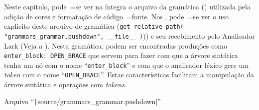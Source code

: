Neste capítulo,
pode~=se ver na íntegra o arquivo da gramática () utilizada pela adição de cores e
formatação de código~=fonte.
Nos ,
pode~=se ver o uso explicito deste arquivo de gramática (\texttt{get_relative_path( "grammars_grammar.pushdown",
__file__ )})) e
seu recebimento pelo Analisador Lark (Veja a ).
Nesta gramática,
podem ser encontradas produções como \texttt{enter_block:
OPEN_BRACE} que servem para fazer com que a árvore sintática tenha um nó com o nome ``\texttt{enter_block}'' e
com que o analisador léxico gere um \textit{token} com o nome ``\texttt{OPEN_BRACE}''.
Estas características facilitam a manipulação da árvore sintática e
operações com \textit{tokens}.
\begin{code}
\caption[Arquivo ``source/grammars\_grammar.pushdown'']{Arquivo ``\texttt|source/grammars_grammar.pushdown|''}
\label{code:grammarsGrammarPushdown}
\inputminted[firstline=39,firstnumber=1]{antlr}{../source/grammars_grammar.pushdown}
\end{code}
